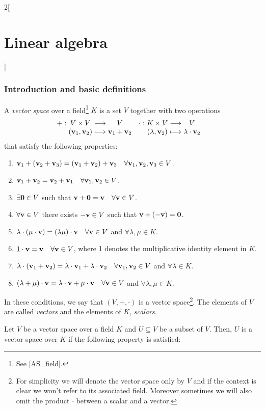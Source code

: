 \documentclass[../../../main_math.tex]{subfiles}
\begin{document}
\begin{multicols}{2}[\section{Linear algebra}]
  \subsubsection{Introduction and basic definitions}
  \begin{definition}
    A \emph{vector space} over a field\footnote{See \cref{AS_field}.} $K$ is a set $V$ together with two operations
    \begin{align*}
      \function{+}{V\times V}{V}{(\vf{v}_1,\vf{v}_2)}{\vf{v}_1+ \vf{v}_2} & \function{\cdot}{K\times V}{V}{(\lambda,\vf{v}_2)}{\lambda\cdot\vf{v}_2}
    \end{align*}
    that satisfy the following properties:
    \begin{enumerate}
      \item $\boldsymbol{\mathrm{v}}_1+(\boldsymbol{\mathrm{v}}_2+\boldsymbol{\mathrm{v}}_3)=(\boldsymbol{\mathrm{v}}_1+\boldsymbol{\mathrm{v}}_2)+\boldsymbol{\mathrm{v}}_3\quad\forall\boldsymbol{\mathrm{v}}_1,\boldsymbol{\mathrm{v}}_2,\boldsymbol{\mathrm{v}}_3\in V$.
      \item $\boldsymbol{\mathrm{v}}_1+\boldsymbol{\mathrm{v}}_2=\boldsymbol{\mathrm{v}}_2+\boldsymbol{\mathrm{v}}_1\quad\forall\boldsymbol{\mathrm{v}}_1,\boldsymbol{\mathrm{v}}_2\in V$.
      \item $\exists\boldsymbol{\mathrm{0}}\in V$ such that $\boldsymbol{\mathrm{v}}+\boldsymbol{\mathrm{0}}=\boldsymbol{\mathrm{v}}\quad\forall\boldsymbol{\mathrm{v}}\in V$.
      \item $\forall\boldsymbol{\mathrm{v}}\in V$ there exists $-\boldsymbol{\mathrm{v}}\in V$ such that $\boldsymbol{\mathrm{v}}+(-\boldsymbol{\mathrm{v}})=\boldsymbol{\mathrm{0}}$.
      \item $\lambda\cdot(\mu\cdot\boldsymbol{\mathrm{v}})=(\lambda\mu)\cdot\boldsymbol{\mathrm{v}}\quad\forall\boldsymbol{\mathrm{v}}\in V$ and $\forall\lambda,\mu\in K$.
      \item $1\cdot\boldsymbol{\mathrm{v}}=\boldsymbol{\mathrm{v}}\quad\forall\boldsymbol{\mathrm{v}}\in V$, where 1 denotes the multiplicative identity element in $K$.
      \item $\lambda\cdot(\boldsymbol{\mathrm{v}}_1+\boldsymbol{\mathrm{v}}_2)=\lambda\cdot\boldsymbol{\mathrm{v}}_1+\lambda\cdot\boldsymbol{\mathrm{v}}_2\quad\forall\boldsymbol{\mathrm{v}}_1,\boldsymbol{\mathrm{v}}_2\in V$ and $\forall\lambda\in K$.
      \item $(\lambda+\mu)\cdot\boldsymbol{\mathrm{v}}=\lambda\cdot\boldsymbol{\mathrm{v}}+\mu\cdot\boldsymbol{\mathrm{v}}\quad\forall\boldsymbol{\mathrm{v}}\in V$ and $\forall\lambda,\mu\in K$.
    \end{enumerate}
    In these conditions, we say that $(V,+,\cdot)$ is a vector space\footnote{For simplicity we will denote the vector space only by $V$ and if the context is clear we won't refer to its associated field. Moreover sometimes we will also omit the product $\cdot$ between a scalar and a vector.}. The elements of $V$ are called \emph{vectors} and the elements of $K$, \emph{scalars}.
  \end{definition}
  \begin{definition}
    Let $V$ be a vector space over a field $K$ and $U\subseteq V$ be a subset of $V$. Then, $U$ is a vector space over $K$ if the following property is satisfied:

\end{definition}
\end{multicols}
\end{document}
